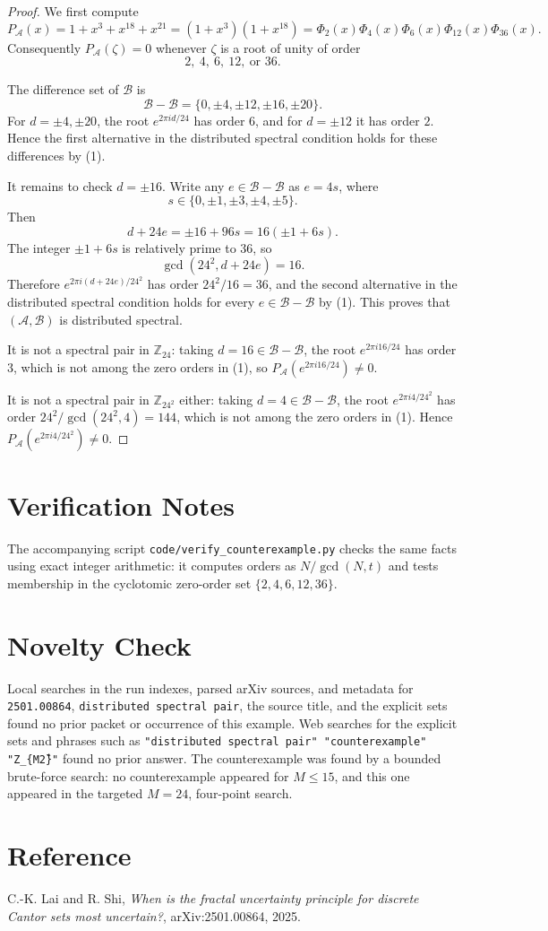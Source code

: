 \documentclass[11pt]{article}
\newcommand{\Z}{\mathbb Z}
\newcommand{\A}{\mathcal A}
\newcommand{\B}{\mathcal B}
\newcommand{\PA}{P_{\mathcal A}}
\begin{document}
\begin{proof}
We first compute
\[
  \PA(x)=1+x^3+x^{18}+x^{21}=(1+x^3)(1+x^{18})
       =\Phi_2(x)\Phi_4(x)\Phi_6(x)\Phi_{12}(x)\Phi_{36}(x).
\]
Consequently $\PA(\zeta)=0$ whenever $\zeta$ is a root of unity of order
\[
  2,\ 4,\ 6,\ 12,\ \text{or }36. \tag{1}
\]

The difference set of $\B$ is
\[
  \B-\B=\{0,\pm4,\pm12,\pm16,\pm20\}.
\]
For $d=\pm4,\pm20$, the root $e^{2\pi i d/24}$ has order $6$, and for
$d=\pm12$ it has order $2$. Hence the first alternative in the distributed spectral condition holds for these differences by (1).

It remains to check $d=\pm16$. Write any $e\in\B-\B$ as $e=4s$, where
\[
  s\in\{0,\pm1,\pm3,\pm4,\pm5\}.
\]
Then
\[
  d+24e=\pm16+96s=16(\pm1+6s).
\]
The integer $\pm1+6s$ is relatively prime to $36$, so
\[
  \gcd(24^2,d+24e)=16.
\]
Therefore $e^{2\pi i(d+24e)/24^2}$ has order $24^2/16=36$, and the second alternative in the distributed spectral condition holds for every $e\in\B-\B$ by (1). This proves that $(\A,\B)$ is distributed spectral.

It is not a spectral pair in $\Z_{24}$: taking $d=16\in\B-\B$, the root $e^{2\pi i16/24}$ has order $3$, which is not among the zero orders in (1), so $\PA(e^{2\pi i16/24})\ne0$.

It is not a spectral pair in $\Z_{24^2}$ either: taking $d=4\in\B-\B$, the root $e^{2\pi i4/24^2}$ has order $24^2/\gcd(24^2,4)=144$, which is not among the zero orders in (1). Hence $\PA(e^{2\pi i4/24^2})\ne0$.
\end{proof}

\section*{Verification Notes}

The accompanying script \texttt{code/verify\_counterexample.py} checks the same facts using exact integer arithmetic: it computes orders as $N/\gcd(N,t)$ and tests membership in the cyclotomic zero-order set $\{2,4,6,12,36\}$.

\section*{Novelty Check}

Local searches in the run indexes, parsed arXiv sources, and metadata for \texttt{2501.00864}, \texttt{distributed spectral pair}, the source title, and the explicit sets found no prior packet or occurrence of this example. Web searches for the explicit sets and phrases such as \texttt{"distributed spectral pair" "counterexample" "Z\_\{M\^2\}"} found no prior answer. The counterexample was found by a bounded brute-force search: no counterexample appeared for $M\le 15$, and this one appeared in the targeted $M=24$, four-point search.

\section*{Reference}

C.-K. Lai and R. Shi, \emph{When is the fractal uncertainty principle for discrete Cantor sets most uncertain?}, arXiv:2501.00864, 2025.
\end{document}
